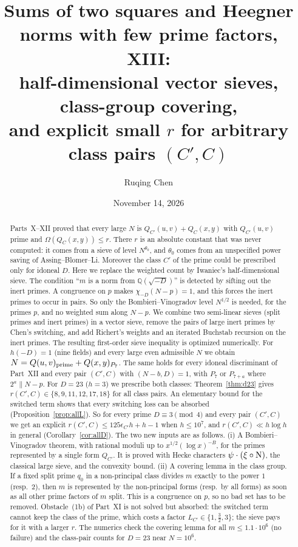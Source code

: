 \documentclass[11pt]{amsart}
\title[Sums of two squares and Heegner norms, XIII]{Sums of two squares and Heegner norms with few prime factors, XIII:\\ half-dimensional vector sieves, class-group covering,\\ and explicit small $r$ for arbitrary class pairs $(C',C)$}
\author{Ruqing Chen}
\date{November 14, 2026}
\theoremstyle{remark}
\newcommand{\Q}{\mathbb Q}
\begin{document}
\begin{abstract}
Parts~X--XII proved that every large $N$ is $Q_{C'}(u,v)+Q_C(x,y)$ with $Q_{C'}(u,v)$ prime and $\Omega(Q_C(x,y))\le r$. There $r$ is an absolute constant that was never computed: it comes from a sieve of level $N^{\theta_0}$, and $\theta_0$ comes from an unspecified power saving of Assing--Blomer--Li. Moreover the class $C'$ of the prime could be prescribed only for idoneal $D$. Here we replace the weighted count by Iwaniec's half-dimensional sieve. The condition ``$m$ is a norm from $\Q(\sqrt{-D})$'' is detected by sifting out the inert primes. A congruence on $p$ makes $\chi_{-D}(N-p)=1$, and this forces the inert primes to occur in pairs. So only the Bombieri--Vinogradov level $N^{1/2}$ is needed, for the primes $p$, and no weighted sum along $N-p$. We combine two semi-linear sieves (split primes and inert primes) in a vector sieve, remove the pairs of large inert primes by Chen's switching, and add Richert's weights and an iterated Buchstab recursion on the inert primes. The resulting first-order sieve inequality is optimized numerically. For $h(-D)=1$ (nine fields) and every large even admissible $N$ we obtain $N=Q(u,v)_{\rm prime}+Q(x,y)_{P_7}$. The same holds for every idoneal discriminant of Part~XII and every pair $(C',C)$ with $(N-b,D)=1$, with $P_7$ or $P_{7+a}$ where $2^a\parallel N-p$. For $D=23$ ($h=3$) we prescribe both classes: Theorem~\ref{thm:d23} gives $r(C',C)\in\{8,9,11,12,17,18\}$ for all class pairs. An elementary bound for the switched term shows that every switching loss can be absorbed (Proposition~\ref{prop:allL}). So for every prime $D\equiv3\pmod4$ and every pair $(C',C)$ we get an explicit $r(C',C)\le 125\epsilon_{C'}h+h-1$ when $h\le10^7$, and $r(C',C)\ll h\log h$ in general (Corollary~\ref{cor:allD}). The two new inputs are as follows. (i) A Bombieri--Vinogradov theorem, with rational moduli up to $x^{1/2}(\log x)^{-B}$, for the primes represented by a single form $Q_{C'}$. It is proved with Hecke characters $\psi\cdot(\xi\circ{\rm N})$, the classical large sieve, and the convexity bound. (ii) A covering lemma in the class group. If a fixed split prime $q_0$ in a non-principal class divides $m$ exactly to the power $1$ (resp.\ $2$), then $m$ is represented by the non-principal forms (resp.\ by all forms) as soon as all other prime factors of $m$ split. This is a congruence on $p$, so no bad set has to be removed. Obstacle~(1b) of Part~XI is not solved but absorbed: the switched term cannot keep the class of the prime, which costs a factor $L_{C'}\in\{1,\frac32,3\}$; the sieve pays for it with a larger $r$. The numerics check the covering lemma for all $m\le1.1\cdot10^6$ (no failure) and the class-pair counts for $D=23$ near $N=10^6$.
\end{abstract}
\maketitle
\end{document}
